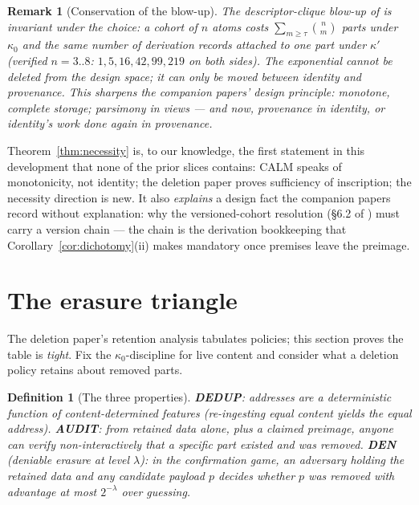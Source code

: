 \documentclass[10pt]{article}
\newtheorem{definition}[theorem]{Definition}
\newtheorem{remark}[theorem]{Remark}
\newcommand{\kz}{\kappa_0}
\newcommand{\kp}{\kappa'}
\begin{document}
\begin{remark}[Conservation of the blow-up]\label{rem:conservation}
The descriptor-clique blow-up of \cite[Prop.~10]{growth} is invariant under the choice: a cohort of $n$ atoms costs $\sum_{m \ge \tau} \binom{n}{m}$ \emph{parts} under $\kz$ and the same number of \emph{derivation records} attached to one part under $\kp$ (verified $n = 3..8$: $1, 5, 16, 42, 99, 219$ on both sides). The exponential cannot be deleted from the design space; it can only be moved between identity and provenance. This sharpens the companion papers' design principle: \emph{monotone, complete storage; parsimony in views} --- and now, \emph{provenance in identity, or identity's work done again in provenance}.
\end{remark}

Theorem~\ref{thm:necessity} is, to our knowledge, the first statement in this development that none of the prior slices contains: CALM \cite{Hellerstein10,AmelootNV13} speaks of monotonicity, not identity; the deletion paper proves sufficiency of inscription; the necessity direction is new. It also \emph{explains} a design fact the companion papers record without explanation: why the versioned-cohort resolution (\S6.2 of \cite{growth}) must carry a version chain --- the chain is the derivation bookkeeping that Corollary~\ref{cor:dichotomy}(ii) makes mandatory once premises leave the preimage.

\section{The erasure triangle}\label{sec:triangle}

The deletion paper's retention analysis tabulates policies; this section proves the table is \emph{tight}. Fix the $\kz$-discipline for live content and consider what a deletion policy retains about removed parts.

\begin{definition}[The three properties]\label{def:three}
\textbf{DEDUP}: addresses are a deterministic function of content-determined features (re-ingesting equal content yields the equal address). \textbf{AUDIT}: from retained data alone, plus a claimed preimage, anyone can verify non-interactively that a specific part existed and was removed. \textbf{DEN} (deniable erasure at level $\lambda$): in the \emph{confirmation game}, an adversary holding the retained data and any candidate payload $p$ decides whether $p$ was removed with advantage at most $2^{-\lambda}$ over guessing.
\end{definition}
\end{document}
